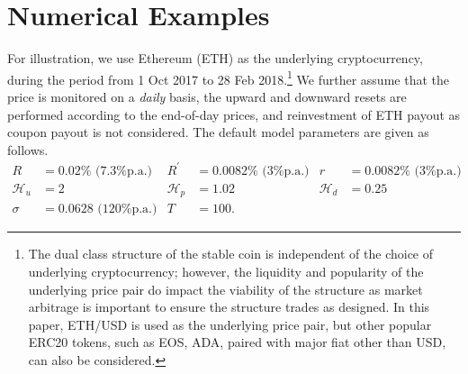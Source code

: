 \documentclass[final,pdftex]{ectaart}
\newcommand{\Ap}{A\ensuremath{^\prime}\xspace}
\newcommand{\Bp}{B\ensuremath{^\prime}\xspace}
\theoremstyle{plain}
\begin{document}




\section{Numerical Examples}

For illustration, we use Ethereum (ETH) as the underlying cryptocurrency, during the period from 1 Oct 2017 to 28 Feb 2018.\footnote{The dual class structure of the stable coin is independent of the choice of underlying cryptocurrency; however, the liquidity and popularity of the underlying price pair do impact the viability of the structure as market arbitrage is important to ensure the structure trades as designed. In this paper, ETH/USD is used as the underlying price pair, but other popular ERC20 tokens, such as EOS, ADA, paired with major fiat other than USD, can also be considered.} We further assume that the price is monitored on a \emph{daily} basis, the upward and downward resets are performed according to the end-of-day prices, and reinvestment of ETH payout as coupon payout is not considered. The default model parameters are given as follows.
\begin{align*}
R& =0.02\% \text{ (7.3\% p.a.)} & R^\prime & = 0.0082\% \text{ (3\% p.a.)} & r&=0.0082\% \text{ (3\% p.a.)}\\
\mathcal{H}_{u} & =2 & \mathcal{H}_{p} & =1.02 & \mathcal{H}_{d} & =0.25 \\
\sigma &= 0.0628 \text{ (120\% p.a.)}& T &= 100 .
\end{align*}
\end{document}
